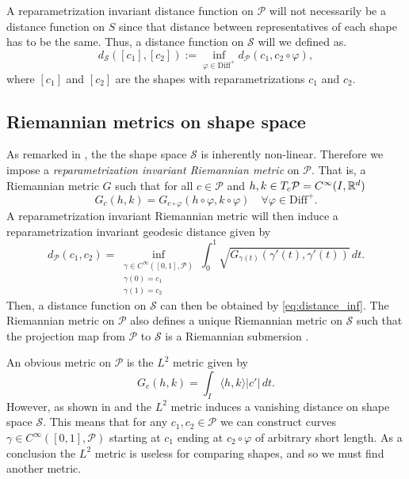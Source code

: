 A reparametrization invariant distance function on \(\mathcal{P}\) will not necessarily be a distance function on \(S\) since  that distance between representatives of each shape has to be the same. Thus, a distance function on \(\mathcal{S}\) will we defined as. 
\begin{equation}
  d_\mathcal{S} ([c_1],[c_2]) := \inf_{\varphi \in \text{Diff}^+}{  d_{\mathcal{P}}(c_1,c_2 \circ \varphi)},
  \label{eq:distance_inf}
\end{equation} 
where  \([c_1]\) and  \([c_2]\) are the shapes with reparametrizations \(c_1\) and  \(c_2\). 

\subsection{Riemannian metrics on shape space}
As remarked in \cite{bauer2014overview}, the the shape space \(\mathcal{S}\) is inherently non-linear. Therefore we impose a \emph{reparametrization invariant Riemannian metric}  on \(\mathcal{P}\). That is, a Riemannian metric \(G\) such that for all \( c \in \mathcal{P}\) and \(h,k \in  T_c \mathcal{P} = C^\infty(I, \mathbb{R}^d) \)
\begin{equation}
  G_c(h,k) = G_{c \circ \varphi}(h\circ \varphi, k \circ \varphi) \quad \forall \varphi \in \text{Diff}^+.
\end{equation}
A reparametrization invariant Riemannian metric will then induce a reparametrization invariant  geodesic distance given by 
\begin{equation}
  d_\mathcal{P}(c_1, c_2) = \inf_{
    \substack{
      \gamma \in C^{\infty}([0,1], \mathcal{P}) \\ 
      \gamma(0) = c_1 \\
      \gamma(1) = c_2
    }
  } \int_0^1 \sqrt{G_{\gamma(t)}(\gamma'(t),\gamma'(t))} \, dt.
\end{equation}
Then, a distance function on \(\mathcal{S}\) can then be obtained by \eqref{eq:distance_inf}. The Riemannian metric on \(\mathcal{P}\) also defines a unique Riemannian metric on \(\mathcal{S}\) such that the projection map from \(\mathcal{P}\) to \(\mathcal{S}\) is a Riemannian submersion \cite[Section 6]{bauer2014_rprop}. 

An obvious metric on \(\mathcal{P}\) is the \(L^2\) metric  given by 
\begin{equation}
  G_c(h,k) = \int_I \langle h, k\rangle \vert c'\vert \,dt. 
\end{equation}
However, as shown in \cite{michor2003vanishingl2} and \cite{michor2004vanishing_generalized} the \(L^2\) metric induces a vanishing distance on shape space \(\mathcal{S}\). This means that for any \(c_1, c_2 \in \mathcal{P}\) we can construct curves \(\gamma \in C^{\infty}([0,1],\mathcal{P})\) starting at \(c_1\) ending at \(c_2 \circ \varphi\) of arbitrary short length. As a conclusion the \(L^2\) metric is useless for comparing shapes, and so we must find another metric. 